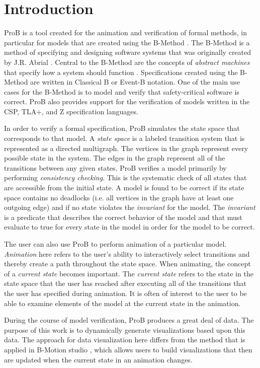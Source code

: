 \section{Introduction}

ProB is a tool created for the animation and verification of formal methods, in particular for models that are created using the B-Method \cite{LeBu03_32}. The B-Method is a method of specifying and designing software systems that was originally created by J.R. Abrial \cite{abrial2005b}. Central to the B-Method are the concepts of \emph{abstract machines} that specify how a system should function \cite{schneider2001b}. Specifications created using the B-Method are written in Classical B or Event-B notation. One of the main use cases for the B-Method is to model and verify that safety-critical software is correct. ProB also provides support for the verification of models written in the CSP, TLA+, and Z specification languages.

In order to verify a formal specification, ProB simulates the state space that corresponds to that model. A \emph{state space} is a labeled transition system that is represented as a directed multigraph. The vertices in the graph represent every possible state in the system. The edges in the graph represent all of the transitions between any given states. ProB verifies a model primarily by performing \emph{consistency checking}. This is the systematic check of all states that are accessible from the initial state. A model is found to be correct if its state space contains no deadlocks (i.e. all vertices in the graph have at least one outgoing edge) and if no state violates the \emph{invariant} for the model. The \emph{invariant} is a predicate that describes the correct behavior of the model and that must evaluate to true for every state in the model in order for the model to be correct. 

The user can also use ProB to perform animation of a particular model. \emph{Animation} here refers to the user's ability to interactively select transitions and thereby create a path throughout the state space. When animating, the concept of a \emph{current state} becomes important. The \emph{current state} refers to the state in the state space that the user has reached after executing all of the transitions that the user has specified during animation. It is often of interest to the user to be able to examine elements of the model at the current state in the animation.

During the course of model verification, ProB produces a great deal of data. The purpose of this work is to dynamically generate visualizations based upon this data. The approach for data visualization here differs from the method that is applied in B-Motion studio \cite{LaBeLe09_258}, which allows users to build visualizations that then are updated when the current state in an animation changes.

